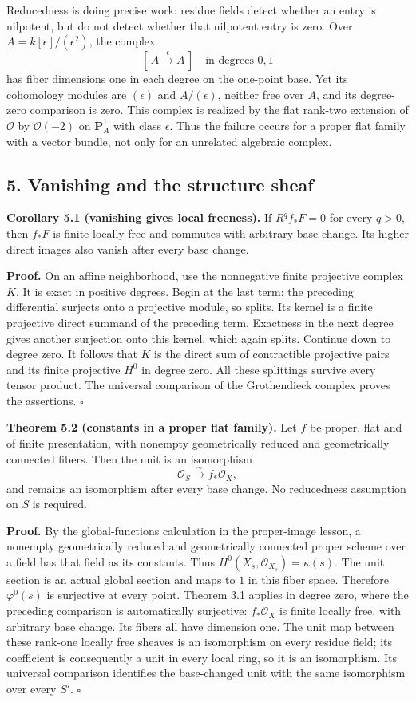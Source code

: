 \documentclass[11pt]{article}
\begin{document}
Reducedness is doing precise work: residue fields detect whether an
entry is nilpotent, but do not detect whether that nilpotent entry is
zero. Over \(A=k[\epsilon]/(\epsilon^2)\), the complex \[
[\,A\xrightarrow{\epsilon}A\,]\quad\text{in degrees }0,1
\] has fiber dimensions one in each degree on the one-point base. Yet
its cohomology modules are \((\epsilon)\) and \(A/(\epsilon)\), neither
free over \(A\), and its degree-zero comparison is zero. This complex is
realized by the flat rank-two extension of \(\mathcal O\) by
\(\mathcal O(-2)\) on \(\mathbf P^1_A\) with class \(\epsilon\). Thus
the failure occurs for a proper flat family with a vector bundle, not
only for an unrelated algebraic complex.

\subsection{5. Vanishing and the structure
sheaf}\label{vanishing-and-the-structure-sheaf}

\textbf{Corollary 5.1 (vanishing gives local freeness).} If
\(R^qf_*F=0\) for every \(q>0\), then \(f_*F\) is finite locally free
and commutes with arbitrary base change. Its higher direct images also
vanish after every base change.

\textbf{Proof.} On an affine neighborhood, use the nonnegative finite
projective complex \(K\). It is exact in positive degrees. Begin at the
last term: the preceding differential surjects onto a projective module,
so splits. Its kernel is a finite projective direct summand of the
preceding term. Exactness in the next degree gives another surjection
onto this kernel, which again splits. Continue down to degree zero. It
follows that \(K\) is the direct sum of contractible projective pairs
and its finite projective \(H^0\) in degree zero. All these splittings
survive every tensor product. The universal comparison of the
Grothendieck complex proves the assertions. \(\square\)

\textbf{Theorem 5.2 (constants in a proper flat family).} Let \(f\) be
proper, flat and of finite presentation, with nonempty geometrically
reduced and geometrically connected fibers. Then the unit is an
isomorphism \[
\mathcal O_S\xrightarrow{\sim}f_*\mathcal O_X,
\] and remains an isomorphism after every base change. No reducedness
assumption on \(S\) is required.

\textbf{Proof.} By the global-functions calculation in the proper-image
lesson, a nonempty geometrically reduced and geometrically connected
proper scheme over a field has that field as its constants. Thus
\(H^0(X_s,\mathcal O_{X_s})=\kappa(s)\). The unit section is an actual
global section and maps to \(1\) in this fiber space. Therefore
\(\varphi^0(s)\) is surjective at every point. Theorem 3.1 applies in
degree zero, where the preceding comparison is automatically surjective:
\(f_*\mathcal O_X\) is finite locally free, with arbitrary base change.
Its fibers all have dimension one. The unit map between these rank-one
locally free sheaves is an isomorphism on every residue field; its
coefficient is consequently a unit in every local ring, so it is an
isomorphism. Its universal comparison identifies the base-changed unit
with the same isomorphism over every \(S'\). \(\square\)
\end{document}
